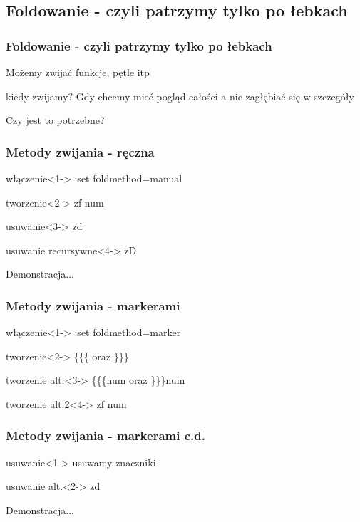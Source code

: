 \documentclass[10pt]{beamer}
\begin{document}
\subsection{Foldowanie - czyli patrzymy tylko po łebkach}
\begin{frame}
	\frametitle{Foldowanie - czyli patrzymy tylko po łebkach}
	{
		Możemy zwijać funkcje, pętle itp\\
	}
	\uncover<2->
	{
		\begin{block}{kiedy zwijamy?}
			Gdy chcemy mieć pogląd całości a nie zagłębiać się w szczegóły
		\end{block}
	}
	{
		Czy jest to potrzebne?
	}
\end{frame}
\begin{frame}
	\frametitle{Metody zwijania - ręczna}
	\begin{block}{włączenie}<1->
	:set foldmethod=manual
	\end{block}
	\begin{block}{tworzenie}<2->
	zf num
	\end{block}
	\begin{block}{usuwanie}<3->
	zd
	\end{block}
	\begin{block}{usuwanie recursywne}<4->
	zD
	\end{block}
	{
		Demonstracja...
	}
\end{frame}
\begin{frame}
	\frametitle{Metody zwijania - markerami}
	\begin{block}{włączenie}<1->
	:set foldmethod=marker
	\end{block}
	\begin{block}{tworzenie}<2->
	\{\{\{ oraz \}\}\}
	\end{block}
	\begin{block}{tworzenie alt.}<3->
	\{\{\{num oraz \}\}\}num
	\end{block}
	\begin{block}{tworzenie alt.2}<4->
	zf num
	\end{block}
\end{frame}
\begin{frame}
	\frametitle{Metody zwijania - markerami c.d.}
	\begin{block}{usuwanie}<1->
	usuwamy znaczniki
	\end{block}
	\begin{block}{usuwanie alt.}<2->
	zd
	\end{block}
	{
		Demonstracja...
	}
\end{frame}
\end{document}
